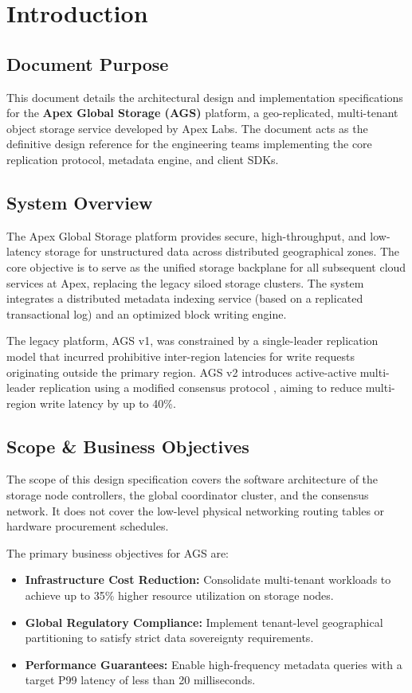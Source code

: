 \section{Introduction}

\subsection{Document Purpose}
This document details the architectural design and implementation specifications for the \textbf{Apex Global Storage (AGS)} platform, a geo-replicated, multi-tenant object storage service developed by Apex Labs. The document acts as the definitive design reference for the engineering teams implementing the core replication protocol, metadata engine, and client SDKs.

\subsection{System Overview}
The Apex Global Storage platform provides secure, high-throughput, and low-latency storage for unstructured data across distributed geographical zones. The core objective is to serve as the unified storage backplane for all subsequent cloud services at Apex, replacing the legacy siloed storage clusters. The system integrates a distributed metadata indexing service (based on a replicated transactional log) and an optimized block writing engine.

\begin{designbox}
    The legacy platform, AGS v1, was constrained by a single-leader replication model that incurred prohibitive inter-region latencies for write requests originating outside the primary region. AGS v2 introduces active-active multi-leader replication using a modified consensus protocol \cite{vance2025consensus}, aiming to reduce multi-region write latency by up to 40\%.
\end{designbox}

\subsection{Scope \& Business Objectives}
The scope of this design specification covers the software architecture of the storage node controllers, the global coordinator cluster, and the consensus network. It does not cover the low-level physical networking routing tables or hardware procurement schedules. 

The primary business objectives for AGS are:
\begin{itemize}
    \item \textbf{Infrastructure Cost Reduction:} Consolidate multi-tenant workloads to achieve up to 35\% higher resource utilization on storage nodes.
    \item \textbf{Global Regulatory Compliance:} Implement tenant-level geographical partitioning to satisfy strict data sovereignty requirements.
    \item \textbf{Performance Guarantees:} Enable high-frequency metadata queries with a target P99 latency of less than 20 milliseconds.
\end{itemize}

